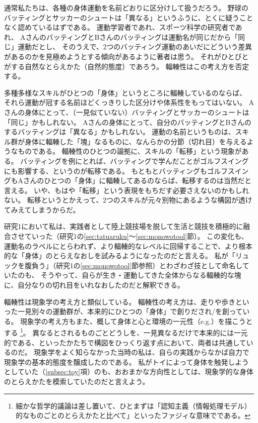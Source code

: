 通常私たちは、各種の身体運動を名前どおりに区分けして扱うだろう。
野球のバッティングとサッカーのシュートは「異なる」というふうに、とくに疑うことなく認めているはずである。
運動学習者であれ、スポーツ科学の研究者であれ、
AさんのバッティングとBさんのバッティングは運動名が同じだから「同じ」運動だとし、
そのうえで、2つのバッティング運動のあいだにどういう差異があるのかを見極めようとする傾向があるように著者は思う。
それがひとびとがする自然なとらえかた（自然的態度）であろう。
輻輳性はこの考え方を否定する。

多種多様なスキルがひとつの「身体」というところに輻輳しているのならば、
それら運動が冠する名前ほどくっきりした区分けや体系性をもってはいない。
Aさんの身体にとって、（一見似ていない）バッティングとサッカーのシュートは「同じ」かもしれない。
Aさんの身体にとって、自分のバッティングとBさんのするバッティングは「異なる」かもしれない。
運動の名前というものは、スキル群が身体に輻輳した「塊」なるものに、なんらかの分節（切れ目）を与えるようなものである。
輻輳性のひとつの論拠に、スキルの「転移」という現象がある。
バッティングを例にとれば、バッティングで学んだことがゴルフスイングにも影響する、というのが転移である。
もともとバッティングもゴルフスイングもAさんのひとつの「身体」に輻輳してあるのならば、転移するのは当然だと言える。
いや、もはや「転移」という表現をもちだす必要さえないのかもしれない。
転移というとかえって、2つのスキルが元々別物にあるような構図が透けてみえてしまうからだ。

研究1において私は、実践者として陸上競技場を脱して生活と競技を積極的に融合させていった（研究1の\ref{sec:tatuaruku}〜\ref{sec:monowotool}節）。
この変化も、運動名のラベルにとらわれず、より輻輳的なレベルに回帰することで、より根本的な「身体」のとらえなおしを試みるようになったのだと言える。
私が「リュックを腹負う」（研究1の\ref{sec:monowotool}節参照）とわざわざ技として命名していたのも、
そうやって、自らが生き・運動してきた全体からなる輻輳的な塊に、自分なりの切れ目をいれなおしたのだと解釈できる。

輻輳性は現象学の考え方と類似している。
輻輳性の考え方は、走りや歩きといった一見別々の運動群が、本来的にひとつの「身体」で創りだされ/を創っている。
現象学の考え方もまた、概して身体と心と環境の一元性（e.g.\cite{merleau-ponty:1945}）を描こうとする
\footnote{細かな哲学的議論は差し置いて、ひとまずは「認知主義（情報処理モデル）的なものごとのとらえかたと比べて」といったファジィな意味でである。}。
異なるとされるものごとどうしを、一見異なるだけで本来的には一元的である、といったかたちで構図をひっくり返す点において、両者は共通しているのだ。
現象学をよく知らなかった当時の私は、自らの実践からなかば自力で現象学の基本的態度を醸成したのである。
私がトイによって身体を触発しようとしていた（\ref{subsec:toy}項）のも、おおまかな方向性としては、現象学的な身体のとらえかたを模索していたのだと言えよう。

